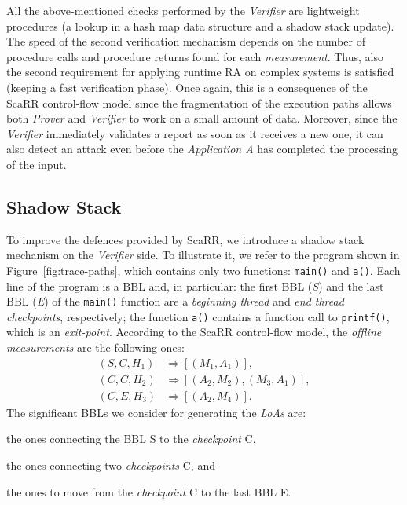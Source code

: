 All the above-mentioned checks performed by the \emph{Verifier} are lightweight 
procedures (\ie a lookup in a hash map data structure and a shadow stack 
update). The speed of the second verification mechanism depends on the number 
of procedure calls and procedure returns found for each \emph{measurement}. 
Thus, also the second requirement for applying runtime RA on complex systems is 
satisfied (\ie keeping a fast verification phase). Once again, this is a 
consequence of the ScaRR control-flow model since the fragmentation of the 
execution paths allows both \emph{Prover} and \emph{Verifier} to work on a 
small amount of data. Moreover, since the \emph{Verifier} immediately validates 
a report as soon as it receives a new one, it can also detect an attack even 
before the \emph{Application A} has completed the processing of the input. 

\subsection{Shadow Stack}
To improve the defences provided by ScaRR, we introduce a shadow stack 
mechanism on the \emph{Verifier} side.
To illustrate it, we refer to the program shown in 
Figure~\ref{fig:trace-paths}, which contains only two functions:
\texttt{main()} and \texttt{a()}. Each line of the program is a BBL and, in 
particular: the first BBL (\ie \emph{S}) and the last BBL (\ie \emph{E}) of the 
\texttt{main()} function are a \emph{beginning thread} and \emph{end thread} 
\emph{checkpoints}, respectively; the function \texttt{a()} contains a function 
call to \texttt{printf()}, which is an \emph{exit-point}. 
According to the ScaRR control-flow model, the \emph{offline measurements} are 
the following ones:
\begin{align*}
(S,C,H_1) &\Rightarrow [(M_1,A_1)], \\
(C,C,H_2) &\Rightarrow [(A_2,M_2), (M_3,A_1)], \\
(C,E,H_3) &\Rightarrow [(A_2,M_4)].
\end{align*}
The significant BBLs we consider for generating the \emph{LoAs} are: 
\begin{enumerate*}[label=(\roman*)]
	\item the ones connecting the BBL S to the \emph{checkpoint} C,
	\item the ones connecting two \emph{checkpoints} C, and
	\item the ones to move from the \emph{checkpoint} C to the last BBL E.
\end{enumerate*}    

